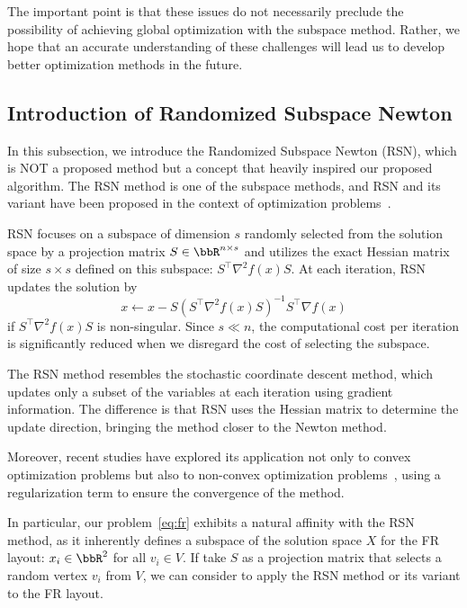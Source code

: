 \documentclass[dvipdfmx,journal]{IEEEtran}
\begin{document}
The important point is that these issues do not necessarily preclude the possibility of achieving global optimization with the subspace method.
Rather, we hope that an accurate understanding of these challenges will lead us to develop better optimization methods in the future.

\subsection{Introduction of Randomized Subspace Newton}\label{ssec:introRSN}

In this subsection, we introduce the Randomized Subspace Newton (RSN), which is NOT a proposed method but a concept that heavily inspired our proposed algorithm.
The RSN method is one of the subspace methods, and RSN and its variant have been proposed in the context of optimization problems~\cite{NEURIPS2019_bc6dc48b,
    fujiRandomizedSubspaceRegularized2022,
    cartisRandomisedSubspaceMethods2022,
    nozawaRandomizedSubspaceGradient2023,
    higuchiFastConvergenceSecondOrder2024}.

RSN focuses on a subspace of dimension $s$ randomly selected from the solution space by a projection matrix $S \in \bbR^{n \times s}$ and utilizes the exact Hessian matrix of size $s \times s$ defined on this subspace: $S^\top \nabla^2 f(x) S$.
At each iteration, RSN updates the solution by
\begin{equation*}
    x \gets x - S (S^\top \nabla^2 f(x) S)^{-1} S^\top \nabla f(x)
\end{equation*}
if $S^\top \nabla^2 f(x) S$ is non-singular.
Since $s \ll n$, the computational cost per iteration is significantly reduced when we disregard the cost of selecting the subspace.

The RSN method resembles the stochastic coordinate descent method, which updates only a subset of the variables at each iteration using gradient information.
The difference is that RSN uses the Hessian matrix to determine the update direction, bringing the method closer to the Newton method.

Moreover, recent studies have explored its application not only to convex optimization problems but also to non-convex optimization problems~\cite{fujiRandomizedSubspaceRegularized2022}, using a regularization term to ensure the convergence of the method.

In particular, our problem~\eqref{eq:fr} exhibits a natural affinity with the RSN method, as it inherently defines a subspace of the solution space $X$ for the FR layout: $x_i \in \bbR^2$ for all $v_i \in V$.
If take $S$ as a projection matrix that selects a random vertex $v_i$ from $V$, we can consider to apply the RSN method or its variant to the FR layout.
\end{document}
